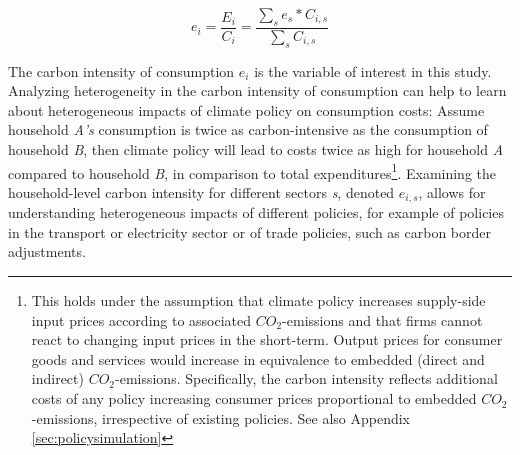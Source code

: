 \documentclass[12pt, a4paper]{article}
\begin{document}
\begin{equation} \label{eq:Ci}
e_{i} = \frac{E_{i}}{C_{i}} = \frac{\sum_{s} e_{s}*C_{i,s}}{\sum_{s} C_{i,s}}
\end{equation}


The carbon intensity of consumption $e_{i}$ is the variable of interest in this study. Analyzing heterogeneity in the carbon intensity of consumption can help to learn about heterogeneous impacts of climate policy on consumption costs: Assume household \textit{A's} consumption is twice as carbon-intensive as the consumption of household \textit{B}, then climate policy will lead to costs twice as high for household \textit{A} compared to household \textit{B}, in comparison to total expenditures\footnote{This holds under the assumption that climate policy increases supply-side input prices according to associated $CO_{2}$-emissions and that firms cannot react to changing input prices in the short-term. Output prices for consumer goods and services would increase in equivalence to embedded (direct and indirect) $CO_{2}$-emissions. Specifically, the carbon intensity reflects additional costs of any policy increasing consumer prices proportional to embedded $CO_{2}$-emissions, irrespective of existing policies. See also Appendix \ref{sec:policysimulation}}. Examining the household-level carbon intensity for different sectors \textit{s}, denoted $e_{i,s}$, allows for understanding heterogeneous impacts of different policies, for example of policies in the transport or electricity sector or of trade policies, such as carbon border adjustments.

\end{document}
